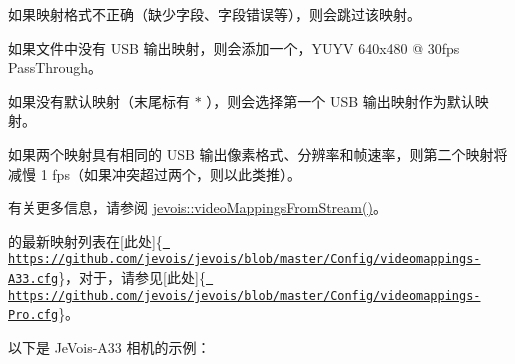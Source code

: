 \begin{DoxyItemize}
\item 如果映射格式不正确（缺少字段、字段错误等），则会跳过该映射。
\item 如果文件中没有 U\+SB 输出映射，则会添加一个，\+Y\+U\+YV 640x480 @ 30fps Pass\+Through。
\item 如果没有默认映射（末尾标有 {\itshape $\ast$} ），则会选择第一个 U\+SB 输出映射作为默认映射。
\item 如果两个映射具有相同的 U\+SB 输出像素格式、分辨率和帧速率，则第二个映射将减慢 1 fps（如果冲突超过两个，则以此类推）。
\end{DoxyItemize}

有关更多信息，请参阅 \mbox{\hyperlink{namespacejevois_a828fc05eea12bd9d7071a1bc561e1835}{jevois\+::video\+Mappings\+From\+Stream()}}。

 的最新映射列表在\mbox{[}此处\mbox{]}\{\href{https://github.com/jevois/jevois/blob/master/Config/videomappings-A33.cfg}{\texttt{ https\+://github.\+com/jevois/jevois/blob/master/\+Config/videomappings-\/\+A33.\+cfg}}\}，对于，请参见\mbox{[}此处\mbox{]}\{\href{https://github.com/jevois/jevois/blob/master/Config/videomappings-Pro.cfg}{\texttt{ https\+://github.\+com/jevois/jevois/blob/master/\+Config/videomappings-\/\+Pro.\+cfg}}\}。

以下是 Je\+Vois-\/\+A33 相机的示例：

